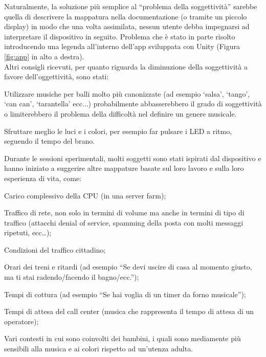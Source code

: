 \documentclass[12pt,a4paper]{report}
\begin{document}
Naturalmente, la soluzione più semplice al ``problema della soggettività'' sarebbe quella di descrivere la mappatura nella documentazione (o tramite un piccolo display) in modo che una volta assimilata, nessun utente debba impegnarsi ad interpretare il dispositivo in seguito. Problema che è stato in parte risolto introducendo una legenda all'interno dell'app sviluppata con Unity (Figura \ref{fig:app} in alto a destra). \\ 


Altri consigli ricevuti, per quanto riguarda la diminuzione della soggettività a favore dell'oggettività, sono stati:
\begin{compactitem}
	\item Utilizzare musiche per balli molto più canonizzate (ad esempio `salsa', `tango', `can can', `tarantella' ecc...) probabilmente abbasserebbero il grado di soggettività o limiterebbero il problema della difficoltà nel definire un genere musicale.	
	\item Sfruttare meglio le luci e i colori, per esempio far pulsare i LED a ritmo, seguendo il tempo del brano. \\
\end{compactitem}


Durante le sessioni sperimentali, molti soggetti sono stati ispirati dal dispositivo e hanno iniziato a suggerire altre mappature basate sul loro lavoro e sulla loro esperienza di vita, come:

\begin{compactitem}
\item Carico complessivo della CPU (in una server farm);

\item Traffico di rete, non solo in termini di volume ma anche in termini di tipo di traffico (attacchi denial of service, spamming della posta con molti messaggi ripetuti, ecc\dots);

\item Condizioni del traffico cittadino;

\item Orari dei treni e ritardi (ad esempio ``Se devi uscire di casa al momento giusto, ma ti stai radendo/facendo il bagno/ecc.'');

\item Tempi di cottura (ad esempio ``Se hai voglia di un timer da forno musicale'');

\item Tempi di attesa del call center (musica che rappresenta il tempo di attesa di un operatore);

\item Vari contesti in cui sono coinvolti  dei bambini, i quali sono mediamente più sensibili alla musica e ai colori rispetto ad un'utenza adulta.

\end{compactitem}
\end{document}
